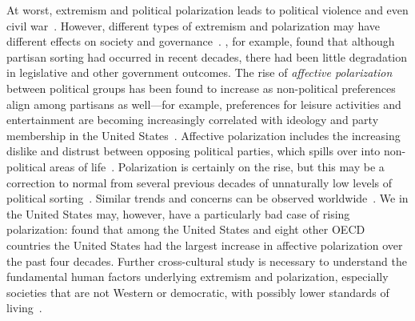\documentclass[12pt,letterpaper]{article}
\begin{document}
At worst, extremism and political
polarization leads to political violence and even civil war~\cite{Epstein2013,Freeman2018}.
However, different types of extremism and polarization may have different
effects on society and governance~\cite{Lelkes2016}. , for example,
found that although partisan sorting had occurred in recent decades, there
had been little degradation in legislative and other government outcomes.
The rise of \emph{affective polarization} between political groups has been found to increase as non-political
preferences align among partisans as well---for example, preferences for
leisure activities and entertainment are becoming increasingly correlated
with ideology and party membership in the United States~\cite{Pew2014PublicPolarization,DellaPosta2015}.
Affective polarization includes the increasing dislike and distrust between opposing political parties, 
which spills over into non-political areas of life~\cite{Iyengar2019}. 
Polarization is certainly on the rise, but this may be a correction to normal from several previous decades of 
unnaturally low levels of political sorting~\cite{Lee2015,Wood2017b}.
Similar trends and concerns can be observed 
worldwide~\cite{Borge-Holthoefer2014,Morales2015,Romenskyy2017,Zmigrod2018}. 
We in the United States may, however, have a particularly bad case of rising polarization: 
 found that among the United States and eight other OECD countries
the United States had the largest increase in affective polarization over the
past four decades. Further cross-cultural study is necessary to understand the fundamental human factors underlying
extremism and polarization, especially societies that are not Western or democratic,
with possibly lower standards of living~\cite{Henrich2010}.
\end{document}
